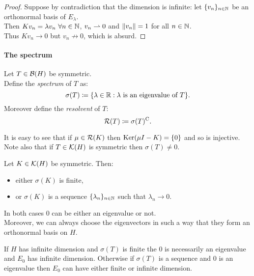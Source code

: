\begin{proof}
	Suppose by contradiction that the dimension is infinite: let $\{v_n\}_{n\in\mathbb N}$ be an orthonormal basis of $E_\lambda$. \\ 
	Then $Kv_n=\lambda v_n \ \forall n \in \mathbb N$, $v_n \rightharpoonup 0$ and $\left\lVert v_n\right\rVert=1$ for all $n \in \mathbb N$. \\
	Thus $Kv_n \to 0$ but $v_n \not \to 0$, which is absurd.
\end{proof}

\paragraph{The spectrum}
\begin{defn}
	Let $T \in \mathcal B(H)$ be symmetric.\\ 
	Define the \emph{spectrum} of $T$ as:
	$$
	\sigma(T) 
	\coloneqq \{\lambda \in \mathbb R : \lambda \text{ is an eigenvalue of } T \}
	.$$
	Moreover define the \emph{resolvent} of $T$:
	$$
	\mathcal R(T) 
	\coloneqq \sigma(T)^{\mathrm{C}}
	.
	$$
\end{defn}

It is easy to see that if $\mu \in \mathcal R(K)$ then $\operatorname{Ker}(\mu I-K) = \{0\}$ and so is injective.\\
Note also that if $T \in \mathcal K(H)$ is symmetric then $\sigma(T) \neq 0$.

\begin{theo}\label{theo-spect}
	Let $K \in \mathcal K(H)$ be symmetric. Then:
	\begin{itemize}
		\item either $\sigma(K)$ is finite,
		\item or $\sigma(K)$ is a sequence $\{ \lambda_n\}_{n \in \mathbb N}$ such that $\lambda_n \to 0$.
	\end{itemize}
	In both cases $0$ can be either an eigenvalue or not.\\%
	Moreover, we can always choose the eigenvectors in such a way that they form an orthonormal basis on $H$.
\end{theo}

If $H$ has infinite dimension and $\sigma(T)$ is finite the $0$ is necessarily an eigenvalue and $E_0$ has infinite dimension.
Otherwise if $\sigma(T)$ is a sequence and $0$ is an eigenvalue then $E_0$ can have either finite or infinite dimension. 

